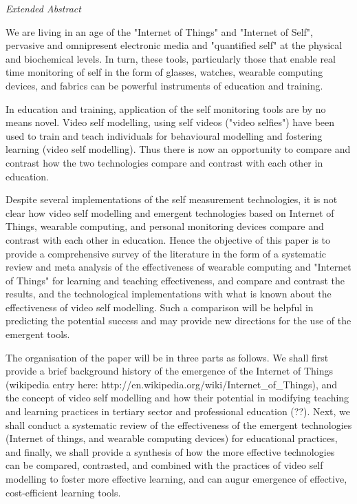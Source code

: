 \textit{Extended Abstract} 

We are living in an age of the "Internet of Things" and "Internet of Self", pervasive and omnipresent electronic media and "quantified self" at the physical and biochemical levels. In turn, these tools, particularly those that enable real time monitoring of self in the form of glasses, watches, wearable computing devices, and fabrics can be powerful instruments of education and training. 

In education and training, application of the self monitoring tools are by no means novel. Video self modelling, using self videos ("video selfies") have been used to train and teach individuals for behavioural modelling and fostering learning (video self modelling). Thus there is now an opportunity to compare and contrast how the two technologies compare and contrast with each other in education. 

Despite several implementations of the self measurement technologies, it is not clear how video self modelling and emergent technologies based on Internet of Things, wearable computing, and personal monitoring devices compare and contrast with each other in education. Hence the objective of this paper is to provide a comprehensive survey of the literature in the form of a systematic review and meta analysis of the effectiveness of wearable computing and "Internet of Things" for learning and teaching effectiveness, and compare and contrast the results, and the technological implementations with what is known about the effectiveness of video self modelling. Such a comparison will be helpful in predicting the potential success and may provide new directions for the use of the emergent tools.

The organisation of the paper will be in three parts as follows. We shall first provide a brief background history of the emergence of the Internet of Things (wikipedia entry here: http://en.wikipedia.org/wiki/Internet_of_Things), and the concept of video self modelling and how their potential in modifying teaching and learning practices in tertiary sector and professional education (??). Next, we shall conduct a systematic review of the effectiveness of the emergent technologies (Internet of things, and wearable computing devices) for educational practices, and finally, we shall provide a synthesis of how the more effective technologies can be compared, contrasted, and combined with the practices of video self modelling to foster more effective learning, and can augur emergence of effective, cost-efficient learning tools.

